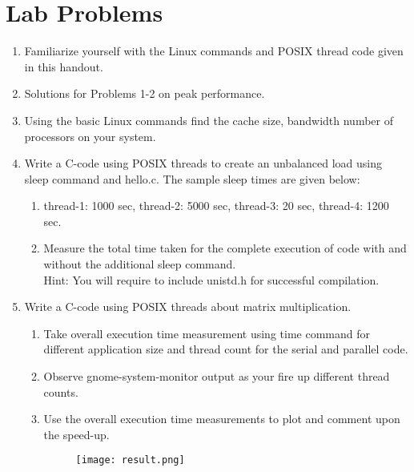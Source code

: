 \documentclass{sem5}
\begin{document}
\section*{Lab Problems}
\begin{enumerate}
\item Familiarize yourself with the Linux commands and POSIX thread code given in this handout.
\item Solutions for Problems 1-2 on peak performance.
\item Using the basic Linux commands find the cache size, bandwidth number of processors on your system.
\item Write a C-code using POSIX threads to create an unbalanced load using sleep command and hello.c. The sample sleep times are given below:
\begin{enumerate}
\item thread-1: 1000 sec, thread-2: 5000 sec, thread-3: 20 sec, thread-4: 1200 sec.
\item Measure the total time taken for the complete execution of code with and without the additional sleep command.\\
Hint: You will require to include unistd.h for successful compilation.
\end{enumerate}
\item Write a C-code using POSIX threads about matrix multiplication.
\begin{enumerate}
\item Take overall execution time measurement using time command for different application size and thread count for the serial and parallel code.
\item Observe gnome-system-monitor output as your fire up different thread counts.
\item Use the overall execution time measurements to plot and comment upon the speed-up.
\begin{figure}[!htp]
\centering
\texttt{[image: result.png]}
\end{figure}
\end{enumerate}
\end{enumerate}
\end{document}
